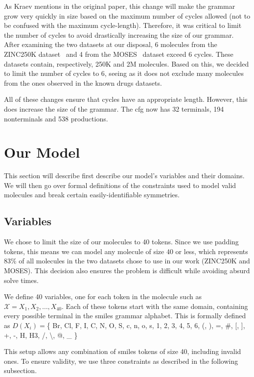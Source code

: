 \documentclass[../Document.tex]{subfiles}
\begin{document}
As Kraev mentions in the original paper\cite{kraev2018grammars}, this change will make the grammar grow very quickly in size based on the maximum number of cycles allowed (not to be confused with the maximum cycle-length).
Therefore, it was critical to limit the number of cycles to avoid drastically increasing the size of our grammar.
After examining the two datasets at our disposal, 6 molecules from the ZINC250K dataset~\cite{Akhmetshin2021} and 4 from the MOSES~\cite{MOSES} dataset exceed 6 cycles. These datasets contain, respectively, 250K and 2M molecules. Based on this, we decided to limit the number of cycles to 6, seeing as it does not exclude many molecules from the ones observed in the known drugs datasets.

All of these changes ensure that cycles have an appropriate length. However, this does increase the size of the grammar. The \gls{cfg} now has 32 terminals, 194 nonterminals and 538 productions.


\section{Our Model}
This section will describe first describe our model's variables and their domains. We will then go over formal definitions of the constraints used to model valid molecules and break certain easily-identifiable symmetries.

\subsection{Variables}
We chose to limit the size of our molecules to 40 tokens. Since we use padding tokens, this means we can model any molecule of size 40 or less, which represents 83\% of all molecules in the two datasets chose to use in our work (ZINC250K and MOSES).
This decision also ensures the problem is difficult while avoiding absurd solve times.

We define 40 variables, one for each token in the molecule such as $\mathcal{X} = {X_1, X_2, \dots, X_{40}}$. Each of these tokens start with the same domain, containing every possible terminal in the \gls{smiles} grammar alphabet. This is formally defined as $D(X_i) = $\{
    Br, Cl, F, I, C, N, O, S, c, n, o, s, 1, 2, 3, 4, 5, 6, (, ), =, \#, [, ], +, -, H, H3, /, \textbackslash, @, \_
\}

This setup allows any combination of \gls{smiles} tokens of size 40, including invalid ones. To ensure validity, we use three constraints as described in the following subsection.
\end{document}
